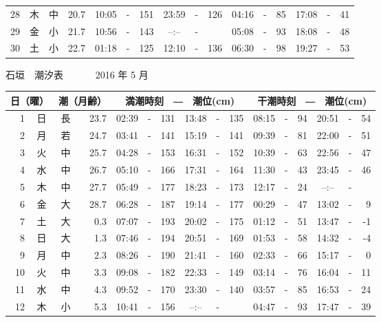 \documentclass[12pt.a4j]{jsarticle}
\begin{document}
\begin{center}
\begin{table}[ht]
\begin{tabular}{|rc|cr|ccrccr|ccrccr|}
28 & 木 & 中 & 20.7 &  10:05 &-& 151  &  23:59 &-& 126  &   04:16 &-&  85  &   17:08 &-&  41  \\
29 & 金 & 小 & 21.7 &  10:56 &-& 143  &  --:-- &-&     &   05:08 &-&  93  &   18:08 &-&  48  \\
30 & 土 & 小 & 22.7 &  01:18 &-& 125  &  12:10 &-& 136  &   06:30 &-&  98  &   19:27 &-&  53  \\
   \hline
   \end{tabular}
\end{table}
\newpage
 {\LARGE 石垣　潮汐表　　　}
 {\large 2016 年  5 月}\\
 \begin{table}[ht]
    \begin{tabular}{|rc|cr|ccrccr|ccrccr|}
    \hline
    \multicolumn{2}{|c|}{日（曜）} & \multicolumn{2}{c|}{潮（月齢）} & \multicolumn{6}{c|}{満潮時刻　―　潮位(cm)} & \multicolumn{6}{c|}{干潮時刻　―　潮位(cm)} \\
 \hline
 1 & 日 & 長 & 23.7 &  02:39 &-& 131  &  13:48 &-& 135  &   08:15 &-&  94  &   20:51 &-&  54  \\
 2 & 月 & 若 & 24.7 &  03:41 &-& 141  &  15:19 &-& 141  &   09:39 &-&  81  &   22:00 &-&  51  \\
 3 & 火 & 中 & 25.7 &  04:28 &-& 153  &  16:31 &-& 152  &   10:39 &-&  63  &   22:56 &-&  47  \\
 4 & 水 & 中 & 26.7 &  05:10 &-& 166  &  17:31 &-& 164  &   11:30 &-&  43  &   23:45 &-&  46  \\
 5 & 木 & 中 & 27.7 &  05:49 &-& 177  &  18:23 &-& 173  &   12:17 &-&  24  &   --:-- &-&     \\
 6 & 金 & 大 & 28.7 &  06:28 &-& 187  &  19:14 &-& 177  &   00:29 &-&  47  &   13:02 &-&   9  \\
 7 & 土 & 大 &  0.3 &  07:07 &-& 193  &  20:02 &-& 175  &   01:12 &-&  51  &   13:47 &-&  -1  \\
 8 & 日 & 大 &  1.3 &  07:46 &-& 194  &  20:51 &-& 169  &   01:53 &-&  58  &   14:32 &-&  -4  \\
 9 & 月 & 中 &  2.3 &  08:26 &-& 190  &  21:41 &-& 160  &   02:33 &-&  66  &   15:17 &-&   0  \\
10 & 火 & 中 &  3.3 &  09:08 &-& 182  &  22:33 &-& 149  &   03:14 &-&  76  &   16:04 &-&  11  \\
11 & 水 & 中 &  4.3 &  09:52 &-& 170  &  23:30 &-& 140  &   03:57 &-&  85  &   16:53 &-&  24  \\
12 & 木 & 小 &  5.3 &  10:41 &-& 156  &  --:-- &-&     &   04:47 &-&  93  &   17:47 &-&  39  \\

\end{tabular}
\end{table}
\end{center}
\end{document}
